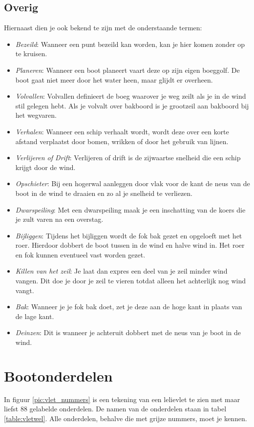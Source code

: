 \subsection{Overig}
Hiernaast dien je ook bekend te zijn met de onderstaande termen:

\begin{itemize}
	
	\item \textit{Bezeild}: Wanneer een punt bezeild kan worden, kan je hier komen zonder op te kruisen. 
	\item \textit{Planeren}: Wanneer een boot planeert vaart deze op zijn eigen boeggolf. De boot gaat niet meer door het water heen, maar glijdt er overheen. 
	\item \textit{Volvallen}: Volvallen definieert de boeg waarover je weg zeilt als je in de wind stil gelegen hebt. Als je volvalt over bakboord is je grootzeil aan bakboord bij het wegvaren.
	\item \textit{Verhalen}: Wanneer een schip verhaalt wordt, wordt deze over een korte afstand verplaatst door bomen, wrikken of door het gebruik van lijnen.
	\item \textit{Verlijeren of Drift}: Verlijeren of drift is de zijwaartse snelheid die een schip krijgt door de wind. 	
	\item \textit{Opschieter}: Bij een hogerwal aanleggen door vlak voor de kant de neus van de boot in de wind te draaien en zo al je snelheid te verliezen.
	\item \textit{Dwarspeiling}: Met een dwarspeiling maak je een inschatting van de koers die je zult varen na een overstag.
	\item \textit{Bijliggen}: Tijdens het bijliggen wordt de fok bak gezet en opgeloeft met het roer. Hierdoor dobbert de boot tussen in de wind en halve wind in. Het roer en fok kunnen eventueel vast worden gezet.
	\item \textit{Killen van het zeil}: Je laat dan expres een deel van je zeil minder wind vangen. Dit doe je door je zeil te vieren totdat alleen het achterlijk nog wind vangt.
	\item \textit{Bak}: Wanneer je je fok bak doet, zet je deze aan de hoge kant in plaats van de lage kant.
	\item \textit{Deinzen}: Dit is wanneer je achteruit dobbert met de neus van je boot in de wind.
\end{itemize}


\section{Bootonderdelen}
In figuur \ref{pic:vlet_nummers} is een tekening van een lelievlet te zien met maar liefst 88 gelabelde onderdelen. De namen van de onderdelen staan in tabel \ref{table:vletwel}. Alle onderdelen, behalve die met grijze nummers, moet je kennen.

